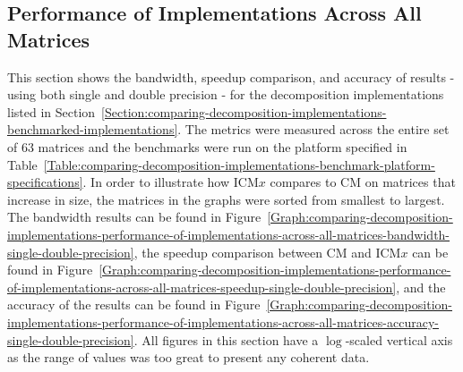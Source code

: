 \subsection{Performance of Implementations Across All Matrices \TO}\label{Subsection:comparing-decomposition-implementations-performance-of-implementations-across-all-matrices}
This section shows the bandwidth, speedup comparison, and accuracy of results - using both single and double precision - for the decomposition implementations listed in Section~\ref{Section:comparing-decomposition-implementations-benchmarked-implementations}. The metrics were measured across the entire set of 63 matrices and the benchmarks were run on the platform specified in Table~\ref{Table:comparing-decomposition-implementations-benchmark-platform-specifications}. In order to illustrate how ICM$ x $ compares to CM on matrices that increase in size, the matrices in the graphs were sorted from smallest to largest. The bandwidth results can be found in Figure~\ref{Graph:comparing-decomposition-implementations-performance-of-implementations-across-all-matrices-bandwidth-single-double-precision}, the speedup comparison between CM and ICM$ x $ can be found in Figure~\ref{Graph:comparing-decomposition-implementations-performance-of-implementations-across-all-matrices-speedup-single-double-precision}, and the accuracy of the results can be found in Figure~\ref{Graph:comparing-decomposition-implementations-performance-of-implementations-across-all-matrices-accuracy-single-double-precision}. All figures in this section have a $ \log $-scaled vertical axis as the range of values was too great to present any coherent data.

